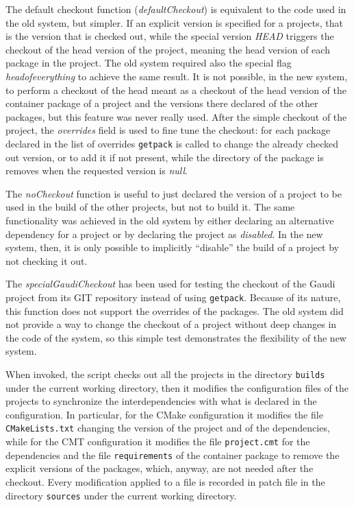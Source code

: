 \documentclass{lhcbnote}
\begin{document}
The default checkout function (\emph{defaultCheckout}) is equivalent to the code
used in the old system, but simpler.  If an explicit version is specified for a
projects, that is the version that is checked out, while the special version
\emph{HEAD} triggers the checkout of the head version of the project, meaning
the head version of each package in the project.  The old system required also
the special flag \emph{headofeverything} to achieve the same result.  It is not
possible, in the new system, to perform a checkout of the head meant as a
checkout of the head version of the container package of a project and the
versions there declared of the other packages, but this feature was never really
used.  After the simple checkout of the project, the \emph{overrides} field is
used to fine tune the checkout: for each package declared in the list of
overrides \texttt{getpack} is called to change the already checked out version,
or to add it if not present, while the directory of the package is removes when
the requested version is \emph{null}.

The \emph{noCheckout} function is useful to just declared the version of a
project to be used in the build of the other projects, but not to build it.  The
same functionality was achieved in the old system by either declaring an
alternative dependency for a project or by declaring the project as
\emph{disabled}.  In the new system, then, it is only possible to implicitly
``disable'' the build of a project by not checking it out.

The \emph{specialGaudiCheckout} has been used for testing the checkout of the
Gaudi project from its GIT repository instead of using \texttt{getpack}.
Because of its nature, this function does not support the overrides of the
packages.  The old system did not provide a way to change the checkout of a
project without deep changes in the code of the system, so this simple test
demonstrates the flexibility of the new system.

When invoked, the script checks out all the projects in the directory
\texttt{builds} under the current working directory, then it modifies the
configuration files of the projects to synchronize the interdependencies with
what is declared in the configuration.  In particular, for the CMake
configuration it modifies the file \texttt{CMakeLists.txt} changing the version
of the project and of the dependencies, while for the CMT configuration it
modifies the file \texttt{project.cmt} for the dependencies and the file
\texttt{requirements} of the container package to remove the explicit versions
of the packages, which, anyway, are not needed after the checkout.  Every
modification applied to a file is recorded in patch file in the directory
\texttt{sources} under the current working directory.
\end{document}
